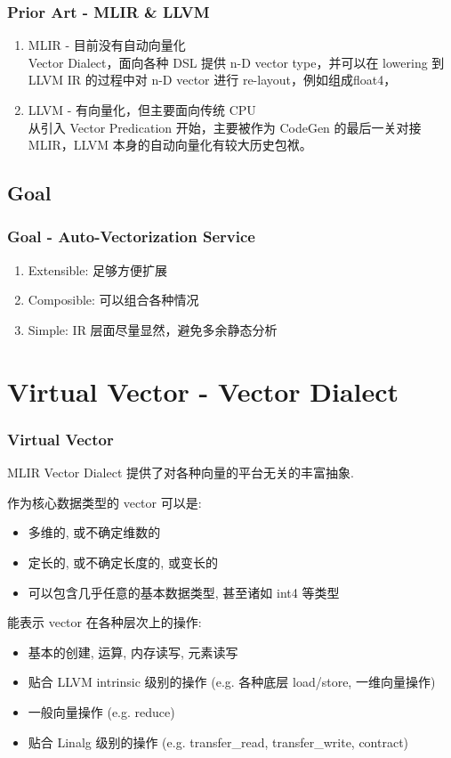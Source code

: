 \documentclass[aspectratio=169]{ctexbeamer}
\begin{document}
\begin{frame}
    \frametitle{Prior Art - MLIR \& LLVM}

    \begin{enumerate}
        \item MLIR - 目前没有自动向量化 \\
              Vector Dialect，面向各种 DSL 提供 n-D vector type，并可以在 lowering 到 LLVM IR 的过程中对 n-D vector 进行 re-layout，例如组成float4，
        \item LLVM - 有向量化，但主要面向传统 CPU \\
              从引入 Vector Predication 开始，主要被作为 CodeGen 的最后一关对接 MLIR，LLVM 本身的自动向量化有较大历史包袱。
    \end{enumerate}
\end{frame}

\subsection{Goal}

\begin{frame}
    \frametitle{Goal - Auto-Vectorization Service}

    \begin{enumerate}
        \item Extensible: 足够方便扩展
        \item Composible: 可以组合各种情况
        \item Simple: IR 层面尽量显然，避免多余静态分析
    \end{enumerate}
\end{frame}

\section{Virtual Vector - Vector Dialect}

\begin{frame}
    \frametitle{Virtual Vector}

    MLIR Vector Dialect 提供了对各种向量的平台无关的丰富抽象.

    作为核心数据类型的 vector 可以是:
    \begin{itemize}
        \item 多维的, 或不确定维数的
        \item 定长的, 或不确定长度的, 或变长的
        \item 可以包含几乎任意的基本数据类型, 甚至诸如 int4 等类型
    \end{itemize}

    能表示 vector 在各种层次上的操作:
    \begin{itemize}
        \item 基本的创建, 运算, 内存读写, 元素读写
        \item 贴合 LLVM intrinsic 级别的操作 (e.g. 各种底层 load/store, 一维向量操作)
        \item 一般向量操作 (e.g. reduce)
        \item 贴合 Linalg 级别的操作 (e.g. transfer\_read, transfer\_write, contract)
    \end{itemize}
\end{frame}
\end{document}
